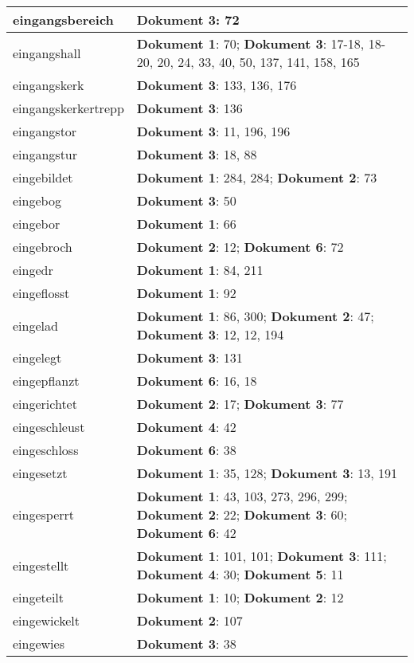 \documentclass[a5paper]{article}
\begin{document}
\begin{longtable}[l]{|l|p{3in}|}
\hline
eingangsbereich & \textbf{Dokument 3}: 72 \\
\hline
eingangshall & \textbf{Dokument 1}: 70; \textbf{Dokument 3}: 17-18, 18-20, 20, 24, 33, 40, 50, 137, 141, 158, 165 \\
\hline
eingangskerk & \textbf{Dokument 3}: 133, 136, 176 \\
\hline
eingangskerkertrepp & \textbf{Dokument 3}: 136 \\
\hline
eingangstor & \textbf{Dokument 3}: 11, 196, 196 \\
\hline
eingangstur & \textbf{Dokument 3}: 18, 88 \\
\hline
eingebildet & \textbf{Dokument 1}: 284, 284; \textbf{Dokument 2}: 73 \\
\hline
eingebog & \textbf{Dokument 3}: 50 \\
\hline
eingebor & \textbf{Dokument 1}: 66 \\
\hline
eingebroch & \textbf{Dokument 2}: 12; \textbf{Dokument 6}: 72 \\
\hline
eingedr & \textbf{Dokument 1}: 84, 211 \\
\hline
eingeflosst & \textbf{Dokument 1}: 92 \\
\hline
eingelad & \textbf{Dokument 1}: 86, 300; \textbf{Dokument 2}: 47; \textbf{Dokument 3}: 12, 12, 194 \\
\hline
eingelegt & \textbf{Dokument 3}: 131 \\
\hline
eingepflanzt & \textbf{Dokument 6}: 16, 18 \\
\hline
eingerichtet & \textbf{Dokument 2}: 17; \textbf{Dokument 3}: 77 \\
\hline
eingeschleust & \textbf{Dokument 4}: 42 \\
\hline
eingeschloss & \textbf{Dokument 6}: 38 \\
\hline
eingesetzt & \textbf{Dokument 1}: 35, 128; \textbf{Dokument 3}: 13, 191 \\
\hline
eingesperrt & \textbf{Dokument 1}: 43, 103, 273, 296, 299; \textbf{Dokument 2}: 22; \textbf{Dokument 3}: 60; \textbf{Dokument 6}: 42 \\
\hline
eingestellt & \textbf{Dokument 1}: 101, 101; \textbf{Dokument 3}: 111; \textbf{Dokument 4}: 30; \textbf{Dokument 5}: 11 \\
\hline
eingeteilt & \textbf{Dokument 1}: 10; \textbf{Dokument 2}: 12 \\
\hline
eingewickelt & \textbf{Dokument 2}: 107 \\
\hline
eingewies & \textbf{Dokument 3}: 38 \\

\end{longtable}
\end{document}
